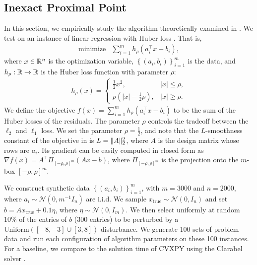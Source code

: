 \documentclass[11pt]{article}
\begin{document}
\subsection{Inexact Proximal Point}
In this section, we empirically study the algorithm theoretically examined in .
We test  on an instance of linear regression with Huber loss \citep{huber1964huberloss}.
That is,
\begin{equation} \label{eq:huber-loss-problem}
    \begin{array}{ll}
        \text{minimize} & \sum_{i=1}^{m} h_\rho(a_i^\top x - b_i),
    \end{array}
\end{equation}
where $x\in\mathbb{R}^n$ is the optimization variable, $\left\{ (a_i,b_i) \right\}_{i=1}^m$ is the data, and $h_\rho:\mathbb{R}\to\mathbb{R}$ is the Huber loss function with parameter $\rho$:
\begin{align}
    h_\rho(x) = \begin{cases}
        \frac{1}{2}x^2, & |x|\leq \rho, \\
        \rho(|x|-\frac{1}{2}\rho), & |x| \geq \rho.
    \end{cases}
\end{align}
We define the objective $f(x) = \sum_{i=1}^{m} h_\rho(a_i^\top x - b_i)$ to be the sum of the Huber losses of the residuals.
The parameter $\rho$ controls the tradeoff between the $\ell_2$ and $\ell_1$ loss.
We set the parameter $\rho = \frac{1}{2}$, and note that the $L$-smoothness constant of the objective in  is $L = \lVert A\rVert_2^2$, where $A$ is the design matrix whose rows are $a_i$.
Its gradient can be easily computed in closed form as $\nabla f(x) = A^\top \Pi_{[-\rho,\rho]^m}(Ax-b)$, where $\Pi_{[-\rho,\rho]^m}$ is the projection onto the $m$-box $[-\rho,\rho]^m$.

We construct synthetic data $\left\{ (a_i,b_i) \right\}_{i=1}^m$, with $m = 3000$ and $n = 2000$, where $a_i \sim\mathcal{N}(0,m^{-1}I_n)$ are i.i.d.
We sample $x_{\mathrm{true}}\sim\mathcal{N}(0,I_n)$ and set $b = A x_{\mathrm{true}} + 0.1 \eta$, where $\eta\sim\mathcal{N}(0,I_m)$.
We then select uniformly at random 10\% of the entries of $b$ (300 entries) to be perturbed by a $\mathrm{Uniform}([-8,-3]\cup[3,8])$ disturbance.
We generate 100 sets of problem data and run each configuration of algorithm parameters on these 100 instances.
For a baseline, we compare to the solution time of CVXPY using the Clarabel solver \citep{agrawal2018rewriting,diamond2016cvxpy,goulart2024clarabel}.
\end{document}
